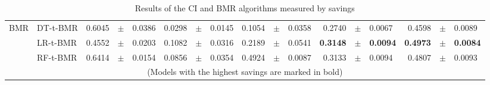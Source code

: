 {\begin{table}[!t]
{\begin{tabular}{l l r@{\hskip 0in}c@{\hskip 0in}l r@{\hskip 0in}c@{\hskip 0in}l r@{\hskip 
    0in}c@{\hskip 0in}l  r@{\hskip 0in}c@{\hskip 0in}l r@{\hskip 0in}c@{\hskip 0in}l}
\hline 
BMR&DT-t-BMR & 0.6045 &$\pm$& 0.0386 & 0.0298 &$\pm$& 0.0145 & 0.1054 &$\pm$& 0.0358& 0.2740 &$\pm$& 0.0067 & 0.4598 &$\pm$& 0.0089 \\
&LR-t-BMR & 0.4552 &$\pm$& 0.0203 & 0.1082 &$\pm$& 0.0316 & 0.2189 &$\pm$& 0.0541 & \bf{0.3148} &\bf{$\pm$}& \bf{0.0094} & \bf{0.4973} &\bf{$\pm$}& \bf{0.0084}\\
&RF-t-BMR & 0.6414 &$\pm$& 0.0154 & 0.0856 &$\pm$& 0.0354 & 0.4924 &$\pm$& 0.0087 & 0.3133 &$\pm$& 0.0094 & 0.4807 &$\pm$& 0.0093\\
  \hline
  \multicolumn{17}{c}{(Models with the highest savings are marked in bold)}
  \end{tabular}
  }
    \caption{Results of the CI and BMR algorithms measured by savings}
    \label{tab:9:results_savings}
  \end{table}
  
}
